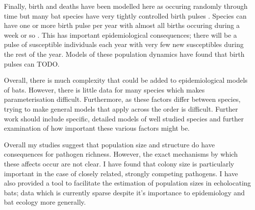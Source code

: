 Finally, birth and deaths have been modelled here as occuring randomly through time but many bat species have very tightly controlled birth pulses \cite{}.
Species can have one or more birth pulse per year with almost all births occuring during a week or so \cite{}.
This has important epidemiological consequences; there will be a pulse of susceptible individuals each year with very few new susceptibles during the rest of the year.
Models of these population dynamics have found that birth pulses can TODO.

Overall, there is much complexity that could be added to epidemiological models of bats.
However, there is little data for many species which makes parameterisation difficult.
Furthermore, as these factors differ between species, trying to make general models that apply across the order is difficult.
Further work should include specific, detailed models of well studied species and further examination of how important these various factors might be.






Overall my studies suggest that population size and structure do have consequences for pathogen richness. 
However, the exact mechanisms by which these affects occur are not clear.
I have found that colony size is particularly important in the case of closely related, strongly competing pathogens.
I have also provided a tool to facilitate the estimation of population sizes in echolocating bats; data which is currently sparse despite it's importance to epidemiology and bat ecology more generally.



